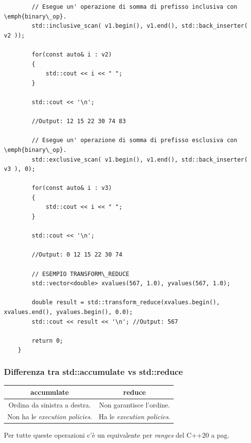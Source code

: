 \begin{lstlisting}
		// Esegue un' operazione di somma di prefisso inclusiva con \emph{binary\_op}.
		std::inclusive_scan( v1.begin(), v1.end(), std::back_inserter( v2 ));
		
		for(const auto& i : v2)
		{
			std::cout << i << " ";
		}
		
		std::cout << '\n';
		
		//Output: 12 15 22 30 74 83
		
		// Esegue un' operazione di somma di prefisso esclusiva con \emph{binary\_op}.
		std::exclusive_scan( v1.begin(), v1.end(), std::back_inserter( v3 ), 0);
		
		for(const auto& i : v3)
		{
			std::cout << i << " ";
		}
		
		std::cout << '\n';
		
		//Output: 0 12 15 22 30 74
		
		// ESEMPIO TRANSFORM\_REDUCE
		std::vector<double> xvalues(567, 1.0), yvalues(567, 1.0);
		
		double result = std::transform_reduce(xvalues.begin(), xvalues.end(), yvalues.begin(), 0.0);
		std::cout << result << '\n'; //Output: 567
		
		return 0;
	}
\end{lstlisting}


\subsubsection{Differenza tra std::accumulate vs std::reduce}

\begin{tabular}{|c|c|}
	\hline
	\textbf{accumulate} & \textbf{reduce} \\
	\hline
	\textsf{\small Ordina da sinistra a destra.} & \textsf{\small Non garantisce l'ordine.} \\
	\hline
	\textsf{\small Non ha le \emph{execution policies}.} & \textsf{\small Ha le \emph{execution policies}.} \\
	\hline
\end{tabular}

\fleuron

\textsf{\small Per tutte queste operazioni c'è un equivalente per \emph{ranges} del C++20 a pag. \pageref{ranges_numeric}} \\


